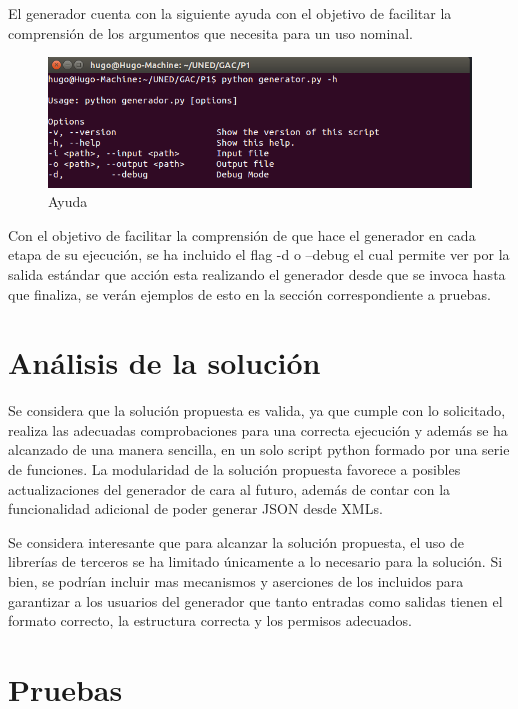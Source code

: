 \documentclass[a4paper,11pt]{book}
\begin{document}
El generador cuenta con la siguiente ayuda con el objetivo de facilitar la comprensión de los argumentos que necesita para un uso nominal. 

\begin{figure}[htbpH]  
\centering 
\includegraphics[scale=0.35]{imagenes/help.png}
\caption{ Ayuda  }  
\end{figure}  


Con el objetivo de facilitar la comprensión de que hace el generador en cada etapa de su ejecución, se ha incluido el flag -d o --debug el cual permite ver por la salida estándar que acción esta realizando el generador desde que se invoca hasta que finaliza, se verán ejemplos de esto en la sección correspondiente a pruebas.     


\section{Análisis de la solución}

	Se considera que la solución propuesta es valida, ya que cumple con lo solicitado, realiza las adecuadas comprobaciones para una correcta ejecución y además se ha alcanzado de una manera sencilla, en un solo script python formado por una serie de funciones. La modularidad de la solución propuesta favorece a posibles actualizaciones del generador de cara al futuro, además de contar con la funcionalidad adicional de poder generar JSON desde XMLs. 

Se considera interesante que para alcanzar la solución propuesta, el uso de librerías de terceros se ha limitado únicamente a lo necesario para la solución. Si bien, se podrían incluir mas mecanismos y aserciones de los incluidos para garantizar a los usuarios del generador que tanto entradas como salidas tienen el formato correcto, la estructura correcta y los permisos adecuados. 
 
\section{Pruebas}
\end{document}
